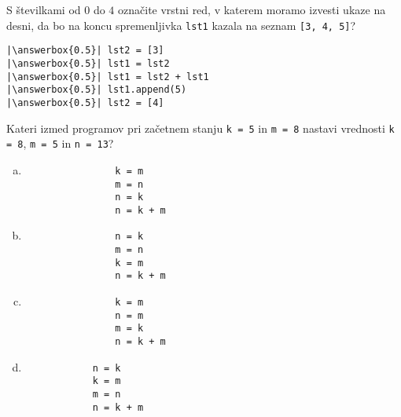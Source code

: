 \documentclass[arhiv, 10pt]{../izpit}
\newcommand{\inlinepy}[1]{\texttt{#1}}
\newcommand{\answerbox}[1]{\framebox{\vphantom{\large M}\hspace{#1cm}}}
\begin{document}
        \naloga*
        \begin{multicols}{2}
        \noindent 
        S številkami od $0$ do $4$ označite vrstni red, v katerem moramo izvesti ukaze na desni, da bo na koncu spremenljivka \inlinepy{lst1} kazala na seznam \inlinepy{[3, 4, 5]}?
    
        \columnbreak
        \noindent
        \begin{verbatim}
|\answerbox{0.5}| lst2 = [3]
|\answerbox{0.5}| lst1 = lst2
|\answerbox{0.5}| lst1 = lst2 + lst1
|\answerbox{0.5}| lst1.append(5)
|\answerbox{0.5}| lst2 = [4]

        \end{verbatim}
        \end{multicols}
    
            
        \naloga*
        
        Kateri izmed programov pri začetnem stanju
            \inlinepy{k = 5} in
            \inlinepy{m = 8}
        nastavi vrednosti
            \inlinepy{k = 8},
            \inlinepy{m = 5} in
            \inlinepy{n = 13}?
    
        \begin{multicols}{4}
        \begin{enumerate}[(a)]
\item 
                \begin{verbatim}
                k = m
                m = n
                n = k
                n = k + m
                \end{verbatim}
            
\item 
                \begin{verbatim}
                n = k
                m = n
                k = m
                n = k + m
                \end{verbatim}
            
\item 
                \begin{verbatim}
                k = m
                n = m
                m = k
                n = k + m
                \end{verbatim}
            
\item 
            \begin{verbatim}
            n = k
            k = m
            m = n
            n = k + m
            \end{verbatim}
        
\end{enumerate}

        \end{multicols}
    
\end{document}
